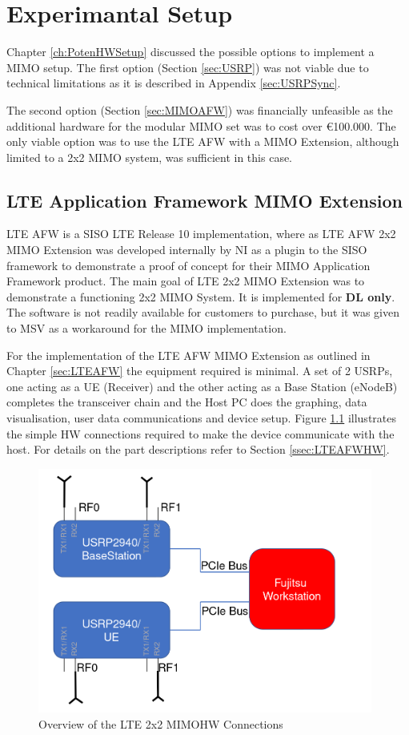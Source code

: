 \chapter{Experimantal Setup}
\label{ch:ExSetup}

Chapter \ref{ch:PotenHWSetup} discussed the possible options to implement a MIMO setup. The first option (Section \ref{sec:USRP}) was not viable due to technical limitations as it is described in Appendix \ref{sec:USRPSync}.

The second option (Section \ref{sec:MIMOAFW}) was financially unfeasible as the additional hardware for the modular MIMO set was to cost over €100.000. The only viable option was to use the LTE AFW with a MIMO Extension, although limited to a 2x2 MIMO system, was sufficient in this case.

\section{LTE Application Framework MIMO Extension}\label{sec:LTEAFWMIMOExt}

LTE AFW is a SISO LTE Release 10 implementation, where as LTE AFW 2x2 MIMO Extension was developed internally by NI as a plugin to the SISO framework to demonstrate a proof of concept for their MIMO Application Framework product. The main goal of LTE 2x2 MIMO Extension was to demonstrate a functioning 2x2 MIMO System. It is implemented for \textbf{DL only}. The software is not readily available for customers to purchase, but it was given to MSV as a workaround for the MIMO implementation.

For the implementation of the LTE AFW MIMO Extension as outlined in Chapter \ref{sec:LTEAFW} the equipment required is minimal. A set of 2 USRPs, one acting as a UE (Receiver) and the other acting as a Base Station (eNodeB) completes the transceiver chain and the Host PC does the graphing, data visualisation, user data communications and device setup. Figure \ref{fig:LTEAFWHWSetup} illustrates the simple HW connections required to make the device communicate with the host. For details on the part descriptions refer to Section \ref{ssec:LTEAFWHW}.

\begin{figure}[!htb]
    \centering
    \includegraphics[width=11cm]{images/MIMOSetUpArrangement.png}
    \caption{Overview of the LTE 2x2 MIMOHW Connections}
    \label{fig:LTEAFWHWSetup}
\end{figure}


